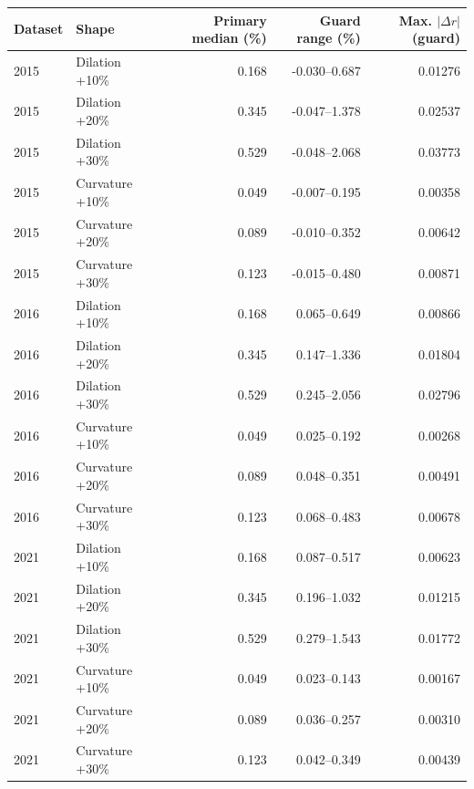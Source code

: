 \begin{tabular}{llrrr}
\toprule
Dataset & Shape & Primary median (\%) & Guard range (\%) & Max. $|\Delta r|$ (guard) \\
\midrule
2015 & Dilation +10\% & 0.168 & -0.030--0.687 & 0.01276 \\
2015 & Dilation +20\% & 0.345 & -0.047--1.378 & 0.02537 \\
2015 & Dilation +30\% & 0.529 & -0.048--2.068 & 0.03773 \\
2015 & Curvature +10\% & 0.049 & -0.007--0.195 & 0.00358 \\
2015 & Curvature +20\% & 0.089 & -0.010--0.352 & 0.00642 \\
2015 & Curvature +30\% & 0.123 & -0.015--0.480 & 0.00871 \\
2016 & Dilation +10\% & 0.168 & 0.065--0.649 & 0.00866 \\
2016 & Dilation +20\% & 0.345 & 0.147--1.336 & 0.01804 \\
2016 & Dilation +30\% & 0.529 & 0.245--2.056 & 0.02796 \\
2016 & Curvature +10\% & 0.049 & 0.025--0.192 & 0.00268 \\
2016 & Curvature +20\% & 0.089 & 0.048--0.351 & 0.00491 \\
2016 & Curvature +30\% & 0.123 & 0.068--0.483 & 0.00678 \\
2021 & Dilation +10\% & 0.168 & 0.087--0.517 & 0.00623 \\
2021 & Dilation +20\% & 0.345 & 0.196--1.032 & 0.01215 \\
2021 & Dilation +30\% & 0.529 & 0.279--1.543 & 0.01772 \\
2021 & Curvature +10\% & 0.049 & 0.023--0.143 & 0.00167 \\
2021 & Curvature +20\% & 0.089 & 0.036--0.257 & 0.00310 \\
2021 & Curvature +30\% & 0.123 & 0.042--0.349 & 0.00439 \\
\bottomrule
\end{tabular}
